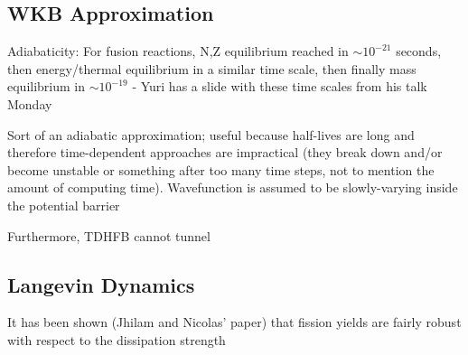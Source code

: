 \subsection{WKB Approximation}

Adiabaticity: For fusion reactions, N,Z equilibrium reached in $\sim10^{-21}$ seconds, then energy/thermal equilibrium in a similar time scale, then finally mass equilibrium in $\sim10^{-19}$ - Yuri has a slide with these time scales from his talk Monday

Sort of an adiabatic approximation; useful because half-lives are long and therefore time-dependent approaches are impractical (they break down and/or become unstable or something after too many time steps, not to mention the amount of computing time). Wavefunction is assumed to be slowly-varying inside the potential barrier

Furthermore, TDHFB cannot tunnel

\subsection{Langevin Dynamics}

It has been shown (Jhilam and Nicolas' paper) that fission yields are fairly robust with respect to the dissipation strength
